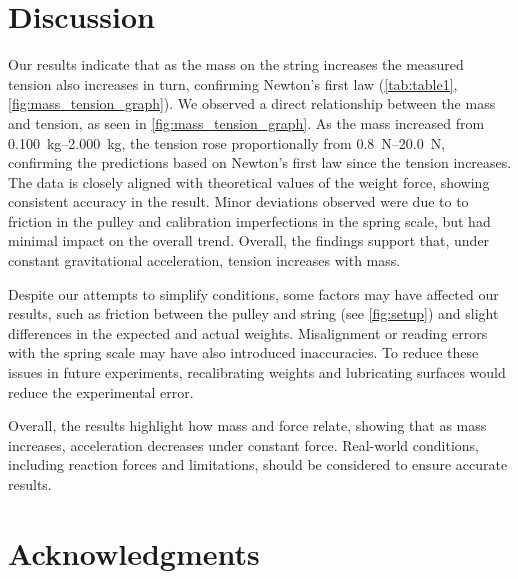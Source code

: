 \documentclass[reprint,amsmath,amssymb,aps]{revtex4-2}
\begin{document}
        
    
\section{Discussion}

Our results indicate that as the mass on the string increases the measured tension also increases in turn, confirming Newton's first law (\cref{tab:table1}, \cref{fig:mass_tension_graph}). We observed a direct relationship between the mass and tension, as seen in \cref{fig:mass_tension_graph}. As the mass increased from \qtyrange{0.100}{2.000}{\kilo\gram}, the tension rose proportionally from \qtyrange{0.8}{20.0}{\newton}, confirming the predictions based on Newton's first law since the tension increases. The data is closely aligned with theoretical values of the weight force, showing consistent accuracy in the result. Minor deviations observed were due to to friction in the pulley and calibration imperfections in the spring scale, but had minimal impact on the overall trend. Overall, the findings support that, under constant gravitational acceleration, tension increases with mass. 
      
Despite our attempts to simplify conditions, some factors may have affected our results, such as friction between the pulley and string (see \cref{fig:setup}) and slight differences in the expected and actual weights. Misalignment or reading errors with the spring scale may have also introduced inaccuracies. To reduce these issues in future experiments, recalibrating weights and lubricating surfaces would reduce the experimental error.
        
Overall, the results highlight how mass and force relate, showing that as mass increases, acceleration decreases under constant force. Real-world conditions, including reaction forces and limitations, should be considered to ensure accurate results.






    
\section{Acknowledgments}
\end{document}
